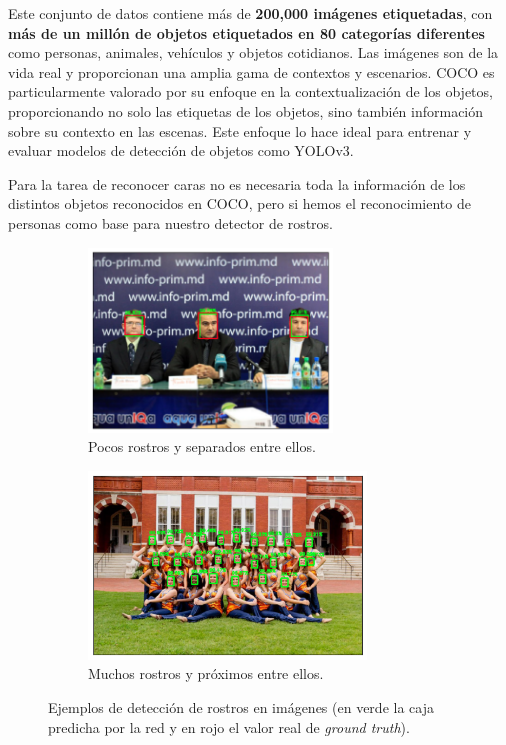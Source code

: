 \documentclass[10pt,twocolumn,letterpaper]{article}
\begin{document}
Este conjunto de datos contiene más de \textbf{200,000 imágenes etiquetadas}, con \textbf{más de un millón de objetos etiquetados en 80 categorías diferentes} como personas, animales, vehículos y objetos cotidianos. Las imágenes son de la vida real y proporcionan una amplia gama de contextos y escenarios.
COCO es particularmente valorado por su enfoque en la contextualización de los objetos, proporcionando no solo las etiquetas de los objetos, sino también información sobre su contexto en las escenas. Este enfoque lo hace ideal para entrenar y evaluar modelos de detección de objetos como YOLOv3.

Para la tarea de reconocer caras no es necesaria toda la información de los distintos objetos reconocidos en COCO, pero si hemos el reconocimiento de personas como base para nuestro detector de rostros.

\begin{figure}[h]
	\begin{subfigure}{0.5\textwidth}
		\centering
		\includegraphics[width=0.9\linewidth, height=4.9cm, keepaspectratio]{1.png}
		\caption{Pocos rostros y separados entre ellos.}
		\label{fig:img1}
	\end{subfigure}
	\begin{subfigure}{0.5\textwidth}
		\centering
		\includegraphics[width=0.9\linewidth, height=5cm, keepaspectratio]{2.png}
		\caption{Muchos rostros y próximos entre ellos.}
		\label{fig:img2}
	\end{subfigure}
\captionsetup{justification=centering}
\caption{Ejemplos de detección de rostros en imágenes (en verde la caja predicha por la red y en rojo el valor real de \textit{ground truth}).}
\label{fig:fig2}
\end{figure}
\end{document}
